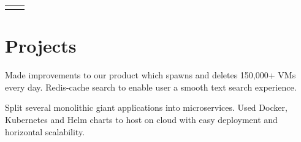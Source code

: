 \documentclass[10pt]{article} %
\begin{document}
\begin{paracol}{2}

\begin{supertabular}{rl} %
	
	
	
	
	
	
	
	
	
	
	
	
\end{supertabular}


\section{Projects}




    {Made improvements to our product which spawns and deletes 150,000+ VMs every day.}
    {Redis-cache search to enable user a smooth text search experience.}

    {Split several monolithic giant applications into microservices.}
    {Used Docker, Kubernetes and Helm charts to host on cloud with easy deployment and horizontal scalability.}


\end{paracol}
\end{document}
